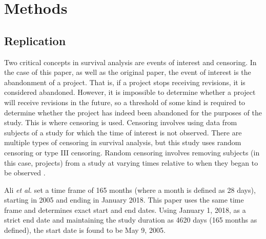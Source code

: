 \documentclass[acmconf]{acmart}
\begin{document}

\section{Methods} \label{methods}

\subsection{Replication}

Two critical concepts in survival analysis are events of interest and censoring.
In the case of this paper, as well as the original paper, the event of interest is the abandonment of a project.
That is, if a project stops receiving revisions, it is considered abandoned.
However, it is impossible to determine whether a project will receive revisions in the future, so a threshold of some kind is required to determine whether the project has indeed been abandoned for the purposes of the study.
This is where censoring is used.
Censoring involves using data from subjects of a study for which the time of interest is not observed.
There are multiple types of censoring in survival analysis, but this study uses random censoring or type III censoring.  
Random censoring involves removing subjects (in this case, projects) from a study at varying times relative to when they began to be observed \cite{renganathan2016overview}. 

Ali \emph{et al.} set a time frame of 165 months (where a month is defined as 28 days), starting in 2005 and ending in January 2018.
This paper uses the same time frame and determines exact start and end dates.
Using January 1, 2018, as a strict end date and maintaining the study duration as 4620 days (165 months as defined), the start date is found to be May 9, 2005.
\end{document}
